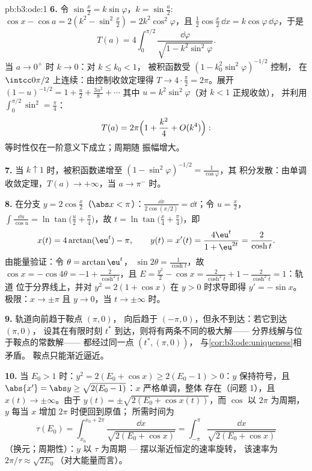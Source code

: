 \begin{solution}{pb:b3:ode:1}
\textbf{6.} 令 $\sin\frac x2 = k\sin\varphi$，$k =
\sin\frac a2$: $\cos x - \cos a = 2(k^2 - \sin^2\frac x2)
= 2k^2\cos^2\varphi$，且 $\frac12\cos\frac x2\,\dd x =
k\cos\varphi\,\dd\varphi$，于是
\[
T(a) = 4\int_0^{\pi/2}
\frac{\dd\varphi}{\sqrt{1 - k^2\sin^2\varphi}} .
\]
当 $a \to 0^+$ 时 $k \to 0$：对 $k \leq k_0 < 1$，
被积函数受 $(1 - k_0^2\sin^2\varphi)^{-1/2}$ 控制，
在 $\intcc0{\pi/2}$ 上连续：由控制收敛定理得 $T \to
4\cdot\frac\pi2 = 2\pi$。展开 $(1 - u)^{-1/2} = 1 +
\frac u2 + \frac{3u^2}8 + \cdots$ 其中 $u =
k^2\sin^2\varphi$（对 $k < 1$ 正规收敛），
并利用 $\int_0^{\pi/2}\sin^2 = \frac\pi4$：
\[
T(a) = 2\pi\Bigl(1 + \frac{k^2}{4} + O(k^4)\Bigr) :
\]
等时性仅在一阶意义下成立；周期随
振幅增大。

\textbf{7.} 当 $k \uparrow 1$ 时，被积函数递增至 $(1
- \sin^2\varphi)^{-1/2} = \frac1{\cos\varphi}$，其
积分发散：由单调收敛定理，$T(a) \to
+\infty$，当 $a \to \pi^-$ 时。

\textbf{8.} 在分支 $y = 2\cos\frac x2$（$\abs x <
\pi$）：$\frac{\dd x}{2\cos(x/2)} = \dd t$；令 $u = \frac
x2$，$\int\frac{\dd u}{\cos u} =
\ln\tan\bigl(\frac u2 + \frac\pi4\bigr)$，故 $t =
\ln\tan\bigl(\frac x4 + \frac\pi4\bigr)$，即
\[
x(t) = 4\arctan(\eu^t) - \pi,
\qquad y(t) = x'(t) = \frac{4\eu^t}{1 + \eu^{2t}} =
\frac{2}{\cosh t} .
\]
由能量验证：令 $\theta = \arctan\eu^t$，
$\sin2\theta = \frac1{\cosh t}$，故 $\cos x = -\cos4\theta =
-1 + \frac{2}{\cosh^2t}$，且 $E = \frac{y^2}2 - \cos x =
\frac2{\cosh^2t} + 1 - \frac2{\cosh^2t} = 1$：轨道
位于分界线上，并对 $y^2 = 2(1 +
\cos x)$ 在 $y > 0$ 时求导即得 $y' = -\sin x$。极限：$x
\to \pm\pi$ 且 $y \to 0$，当 $t \to \pm\infty$ 时。

\textbf{9.} 轨道向前趋于鞍点 $(\pi, 0)$，
向后趋于 $(-\pi, 0)$，但永不到达：若它到达 $(\pi, 0)$，
设其在有限时刻 $t^*$ 到达，则将有两条不同的极大解——
分界线解与位于鞍点的常数解——
都经过同一点
$(t^*, (\pi, 0))$，
与\cref{cor:b3:ode:uniqueness}相矛盾。
鞍点只能渐近逼近。

\textbf{10.} 当 $E_0 > 1$ 时：$y^2 = 2(E_0 + \cos x) \geq
2(E_0 - 1) > 0$：$y$ 保持符号，且 $\abs{x'} = \abs y
\geq \sqrt{2(E_0 - 1)}$：$x$ 严格单调，整体
存在（问题 1），且 $x(t) \to \pm\infty$。由于 $y(t) =
\pm\sqrt{2(E_0 + \cos x(t))}$，而 $\cos$ 以 $2\pi$ 为周期，
$y$ 每当 $x$ 增加 $2\pi$ 时便回到原值；
所需时间为
\[
\tau(E_0) = \int_{x_0}^{x_0 + 2\pi}\frac{\dd
x}{\sqrt{2(E_0 + \cos x)}} =
\int_{-\pi}^{\pi}\frac{\dd x}{\sqrt{2(E_0 + \cos x)}}
\]
（换元；周期性）：$y$ 以 $\tau$ 为周期 ---
摆以渐近恒定的速率旋转，
该速率为 $2\pi/\tau \approx \sqrt{2E_0}$（对大能量而言）。


\end{solution}
